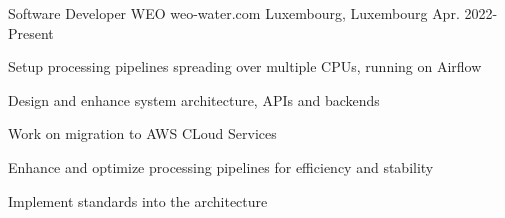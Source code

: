 

\begin{cventries}

  \cventry
    {Software Developer} %
    {WEO {\enskip\cdotp\enskip}weo-water.com} %
    {Luxembourg, Luxembourg} %
    {Apr. 2022- Present} %
    {
      \begin{cvitems} %
        \item {Setup processing pipelines spreading over multiple CPUs, running on Airflow}
        \item {Design and enhance system architecture, APIs and backends}
        \item {Work on migration to AWS CLoud Services}
        \item {Enhance and optimize processing pipelines for efficiency and stability}
        \item {Implement standards into the architecture}
        \end{cvitems}
    }


\end{cventries}
